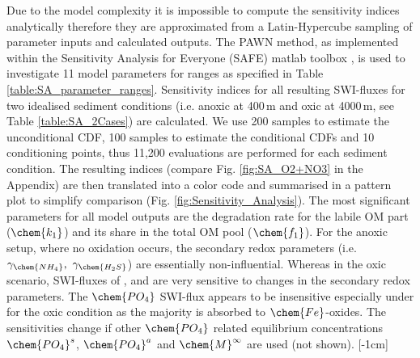 \documentclass[gmd, manuscript]{copernicus}
\begin{document}
Due to the model complexity it is impossible to compute the sensitivity indices analytically therefore they are approximated from a Latin-Hypercube sampling of parameter inputs and calculated outputs.
The PAWN method, as implemented within the Sensitivity Analysis for Everyone (SAFE) matlab toolbox \citep{pianosi_matlab_2015}, is used to investigate 11 model parameters for ranges as specified in Table \ref{table:SA_parameter_ranges}. 
Sensitivity indices for all resulting SWI-fluxes for two idealised sediment conditions (i.e. anoxic at 400\,m and oxic at 4000\,m, see Table \ref{table:SA_2Cases}) are calculated. 
We use 200 samples to estimate the unconditional CDF, 100 samples to estimate the conditional CDFs and 10 conditioning points, thus 11,200 evaluations are performed for each sediment condition. 
The resulting indices (compare Fig. \ref{fig:SA_O2+NO3} in the Appendix) 
are then translated into a color code and summarised in a pattern plot to simplify comparison (Fig. \ref{fig:Sensitivity_Analysis}). 
The most significant parameters for all model outputs are the degradation rate for the labile OM part ($\chem{k_1}$) and its share in the total OM pool ($\chem{f_1}$).
For the anoxic setup, where no oxidation occurs, the secondary redox parameters (i.e. $\gamma_\chem{NH_4},\ \gamma_\chem{H_2S}$) are essentially non-influential. 
Whereas in the oxic scenario, SWI-fluxes of ,  and  are very sensitive to changes in the secondary redox parameters. %
The $\chem{PO_4}$ SWI-flux appears to be insensitive especially under for the oxic condition as the majority is absorbed to $\chem{Fe}$-oxides. The sensitivities change 
if other $\chem{PO_4}$ related equilibrium concentrations $\chem{PO_4}^s$, $\chem{PO_4}^a$ and $\chem{M}^\infty$ are used (not shown).
[-1cm]%
\end{document}
